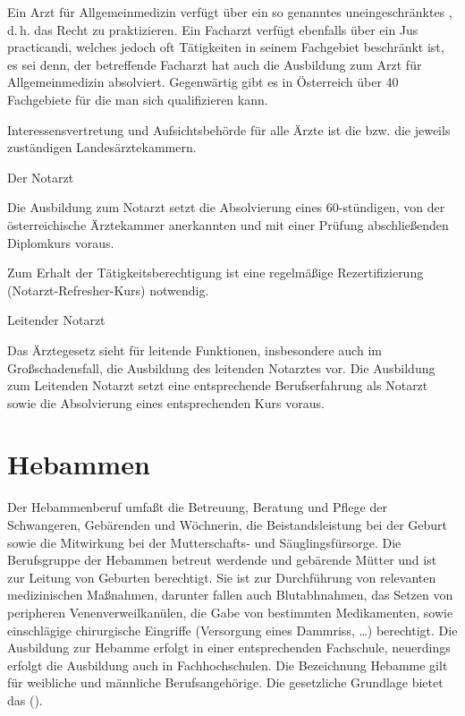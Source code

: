 Ein Arzt für Allgemeinmedizin verfügt über ein so genanntes
uneingeschränktes , d.\,h. das Recht zu
praktizieren. Ein Facharzt verfügt ebenfalls über ein Jus
practicandi, welches jedoch oft Tätigkeiten in seinem
Fachgebiet beschränkt ist, es sei denn, der betreffende
Facharzt hat auch die Ausbildung zum Arzt für
Allgemeinmedizin absolviert. Gegenwärtig gibt es in
Österreich über 40 Fachgebiete für die man sich
qualifizieren kann.

Interessensvertretung und Aufsichtsbehörde für alle Ärzte
ist die  bzw. die jeweils
zuständigen Landesärztekammern.

Der Notarzt

Die Ausbildung zum Notarzt setzt die Absolvierung eines 60-stündigen, von der
österreichische Ärztekammer anerkannten und mit einer
Prüfung abschließenden Diplomkurs
voraus.


Zum Erhalt der
Tätigkeitsberechtigung ist eine regelmäßige
Rezertifizierung (Notarzt-Refresher-Kurs) notwendig.

Leitender Notarzt

Das Ärztegesetz sieht für leitende Funktionen, insbesondere
auch im Großschadensfall, die Ausbildung des leitenden
Notarztes vor. Die Ausbildung zum Leitenden Notarzt setzt
eine entsprechende Berufserfahrung als Notarzt sowie die
Absolvierung eines entsprechenden Kurs voraus.

\section{Hebammen}

Der Hebammenberuf umfaßt die Betreuung, Beratung und Pflege
der Schwangeren, Gebärenden und Wöchnerin, die Beistandsleistung bei der Geburt sowie die Mitwirkung bei der Mutterschafts- und Säuglingsfürsorge. Die Berufsgruppe der Hebammen betreut werdende und gebärende
Mütter und ist zur Leitung von Geburten berechtigt.
Sie ist zur Durchführung von relevanten medizinischen
Maßnahmen, darunter fallen auch Blutabhnahmen, das Setzen von
peripheren Venenverweilkanülen, die Gabe von bestimmten Medikamenten, sowie einschlägige chirurgische
Eingriffe (Versorgung eines Dammriss, \ldots) berechtigt.
Die Ausbildung zur Hebamme erfolgt in einer entsprechenden
Fachschule, neuerdings erfolgt die Ausbildung auch in
Fachhochschulen. Die Bezeichnung Hebamme gilt für weibliche
und männliche Berufsangehörige.
Die gesetzliche Grundlage bietet das 
().

